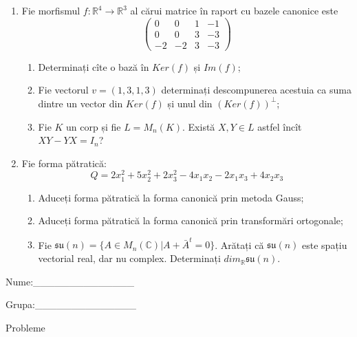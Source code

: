 \documentclass{article}
\begin{document}
\begin{enumerate}
 \item Fie morfismul $f:\mathbb{R}^4 \to \mathbb{R}^3$ al cărui matrice în raport cu bazele canonice este
$$\begin{pmatrix}
0&0&1&-1\\
0&0&3&-3\\
-2&-2&3&-3
\end{pmatrix}$$

\begin{enumerate}
\item Determinați cîte o bază în $Ker(f)$ și $Im(f)$;
\item Fie vectorul $v=(1,3,1,3)$ determinați descompunerea acestuia ca suma dintre un vector din $Ker(f)$ și unul din $(Ker(f))^\perp$;
\item Fie $K$ un corp și fie $L=M_n(K)$. Există $X,Y \in L$ astfel încît $XY-YX=I_n$?  
\end{enumerate}
\item Fie forma pătratică:
$$Q= 2x_1^2+5x_2^2+2x_3^2-4x_1x_2-2x_1x_3+4x_2x_3$$

\begin{enumerate}
\item Aduceți forma pătratică la forma canonică prin metoda Gauss;
\item Aduceți forma pătratică la forma canonică prin transformări ortogonale;
\item Fie $\mathfrak{su}(n)=\{ A \in M_n(\mathbb{C}) | A+\bar{A}^t=0\}$. Arătați că $\mathfrak{su}(n)$ este spațiu vectorial real, dar nu complex.
Determinați $dim_{\mathbb{R}}\mathfrak{su}(n)$.
\end{enumerate}
\end{enumerate}
\newpage
\begin{flushright}
Nume:\_\_\_\_\_\_\_\_\_\_\_\_\_\_
 
 
Grupa:\_\_\_\_\_\_\_\_\_\_\_\_\_\_
\end{flushright}
\begin{center}
\vspace{2cm}
{\Large Probleme}
\vspace{2cm}
\end{center}
\end{document}
